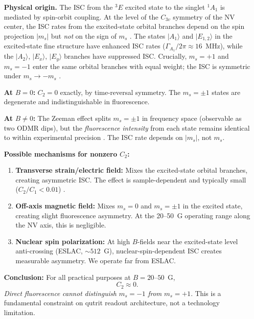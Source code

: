 \documentclass[11pt,letterpaper]{article}
\begin{document}
\textbf{Physical origin.}  The ISC from the $^3E$ excited state to the singlet
$^1A_1$ is mediated by spin-orbit coupling.  At the level of the $C_{3v}$
symmetry of the NV center, the ISC rates from the excited-state orbital
branches depend on the spin projection $|m_s|$ but \emph{not} on the sign of
$m_s$ \cite{Goldman2015a, Batalov2009}.  The states $|A_1\rangle$ and
$|E_{1,2}\rangle$ in the excited-state fine structure have enhanced ISC rates
($\Gamma_{A_1}/2\pi \approx 16$~MHz), while the $|A_2\rangle$, $|E_x\rangle$,
$|E_y\rangle$ branches have suppressed ISC.  Crucially, $m_s = +1$ and
$m_s = -1$ enter the same orbital branches with equal weight; the ISC is
symmetric under $m_s \to -m_s$ \cite{Goldman2015a}.

\textbf{At $B = 0$:} $C_2 = 0$ exactly, by time-reversal symmetry.  The
$m_s = \pm 1$ states are degenerate and indistinguishable in fluorescence.

\textbf{At $B \neq 0$:} The Zeeman effect splits $m_s = \pm 1$ in frequency
space (observable as two ODMR dips), but the \emph{fluorescence intensity}
from each state remains identical to within experimental precision
\cite{Doherty2013}.  The ISC rate depends on $|m_s|$, not $m_s$.

\textbf{Possible mechanisms for nonzero $C_2$:}
\begin{enumerate}
  \item \textbf{Transverse strain/electric field:} Mixes the excited-state
    orbital branches, creating asymmetric ISC.  The effect is
    sample-dependent and typically small ($C_2/C_1 < 0.01$)
    \cite{Doherty2013}.
  \item \textbf{Off-axis magnetic field:} Mixes $m_s = 0$ and $m_s = \pm 1$
    in the excited state, creating slight fluorescence asymmetry.  At the
    20--50~G operating range along the NV axis, this is negligible.
  \item \textbf{Nuclear spin polarization:} At high $B$-fields near the
    excited-state level anti-crossing (ESLAC, $\sim 512$~G), nuclear-spin-dependent
    ISC creates measurable asymmetry.  We operate far from ESLAC.
\end{enumerate}

\textbf{Conclusion:} For all practical purposes at $B = 20$--$50$~G,
\begin{equation}
  \boxed{C_2 \approx 0.}
  \label{eq:C2zero}
\end{equation}
\emph{Direct fluorescence cannot distinguish $m_s = -1$ from $m_s = +1$.}
This is a fundamental constraint on qutrit readout architecture, not a
technology limitation.
\end{document}
